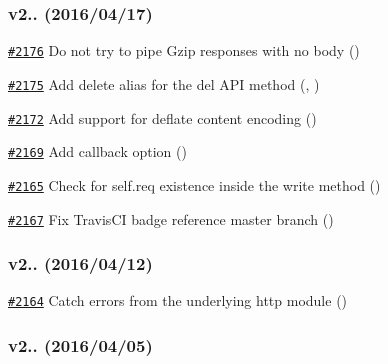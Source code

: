\subsubsection*{v2.. (2016/04/17)}


\begin{DoxyItemize}
\item \href{https://github.com/request/request/pull/2176}{\tt \#2176} Do not try to pipe Gzip responses with no body ()
\item \href{https://github.com/request/request/pull/2175}{\tt \#2175} Add \textquotesingle{}delete\textquotesingle{} alias for the \textquotesingle{}del\textquotesingle{} A\+PI method (, )
\item \href{https://github.com/request/request/pull/2172}{\tt \#2172} Add support for deflate content encoding ()
\item \href{https://github.com/request/request/pull/2169}{\tt \#2169} Add callback option ()
\item \href{https://github.com/request/request/pull/2165}{\tt \#2165} Check for self.\+req existence inside the write method ()
\item \href{https://github.com/request/request/pull/2167}{\tt \#2167} Fix Travis\+CI badge reference master branch ()
\end{DoxyItemize}

\subsubsection*{v2.. (2016/04/12)}


\begin{DoxyItemize}
\item \href{https://github.com/request/request/pull/2164}{\tt \#2164} Catch errors from the underlying http module ()
\end{DoxyItemize}

\subsubsection*{v2.. (2016/04/05)}


